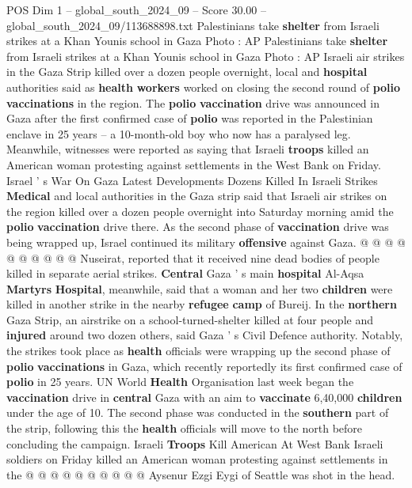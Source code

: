 \begin{textsample}{POS Dim 1 – global\_south\_2024\_09 – Score 30.00 – global\_south\_2024\_09/113688898.txt}  \label{ex:f1_pos_202}
Palestinians take \textbf{shelter} from Israeli strikes at a Khan Younis school in Gaza Photo : AP Palestinians take \textbf{shelter} from Israeli strikes at a Khan Younis school in Gaza Photo : AP Israeli air strikes in the Gaza Strip killed over a dozen people overnight, local and \textbf{hospital} authorities said as \textbf{health} \textbf{workers} worked on closing the second round of \textbf{polio} \textbf{vaccinations} in the region.
The \textbf{polio} \textbf{vaccination} drive was announced in Gaza after the first confirmed case of \textbf{polio} was reported in the Palestinian enclave in 25 years -- a 10-month-old boy who now has a paralysed leg.
Meanwhile, witnesses were reported as saying that Israeli \textbf{troops} killed an American woman protesting against settlements in the West Bank on Friday.
Israel ' s War On Gaza Latest Developments Dozens Killed In Israeli Strikes \textbf{Medical} and local authorities in the Gaza strip said that Israeli air strikes on the region killed over a dozen people overnight into Saturday morning amid the \textbf{polio} \textbf{vaccination} drive there.
As the second phase of \textbf{vaccination} drive was being wrapped up, Israel continued its military \textbf{offensive} against Gaza. @ @ @ @ @ @ @ @ @ @ Nuseirat, reported that it received nine dead bodies of people killed in separate aerial strikes. \textbf{Central} Gaza ' s main \textbf{hospital} Al-Aqsa \textbf{Martyrs} \textbf{Hospital}, meanwhile, said that a woman and her two \textbf{children} were killed in another strike in the nearby \textbf{refugee} \textbf{camp} of Bureij.
In the \textbf{northern} Gaza Strip, an airstrike on a school-turned-shelter killed at four people and \textbf{injured} around two dozen others, said Gaza ' s Civil Defence authority.
Notably, the strikes took place as \textbf{health} officials were wrapping up the second phase of \textbf{polio} \textbf{vaccinations} in Gaza, which recently reportedly its first confirmed case of \textbf{polio} in 25 years.
UN World \textbf{Health} Organisation last week began the \textbf{vaccination} drive in \textbf{central} Gaza with an aim to \textbf{vaccinate} 6,40,000 \textbf{children} under the age of 10.
The second phase was conducted in the \textbf{southern} part of the strip, following this the \textbf{health} officials will move to the north before concluding the campaign.
Israeli \textbf{Troops} Kill American At West Bank Israeli soldiers on Friday killed an American woman protesting against settlements in the @ @ @ @ @ @ @ @ @ @ Aysenur Ezgi Eygi of Seattle was shot in the head.

\end{textsample}
